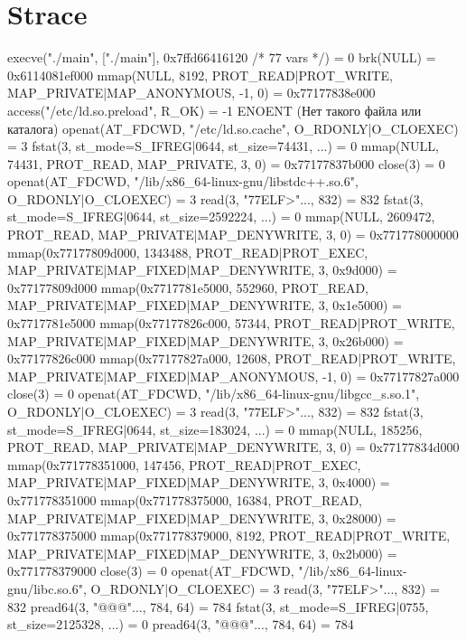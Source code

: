 \section{Strace}
\begin{breakableverbatim}
execve("./main", ["./main"], 0x7ffd66416120 /* 77 vars */) = 0
brk(NULL)                               = 0x6114081ef000
mmap(NULL, 8192, PROT_READ|PROT_WRITE, MAP_PRIVATE|MAP_ANONYMOUS, -1, 0) = 0x77177838e000
access("/etc/ld.so.preload", R_OK)      = -1 ENOENT (Нет такого файла или каталога)
openat(AT_FDCWD, "/etc/ld.so.cache", O_RDONLY|O_CLOEXEC) = 3
fstat(3, {st_mode=S_IFREG|0644, st_size=74431, ...}) = 0
mmap(NULL, 74431, PROT_READ, MAP_PRIVATE, 3, 0) = 0x77177837b000
close(3)                                = 0
openat(AT_FDCWD, "/lib/x86_64-linux-gnu/libstdc++.so.6", O_RDONLY|O_CLOEXEC) = 3
read(3, "\177ELF\2\1\1\3\0\0\0\0\0\0\0\0\3\0>\0\1\0\0\0\0\0\0\0\0\0\0\0"..., 832) = 832
fstat(3, {st_mode=S_IFREG|0644, st_size=2592224, ...}) = 0
mmap(NULL, 2609472, PROT_READ, MAP_PRIVATE|MAP_DENYWRITE, 3, 0) = 0x771778000000
mmap(0x77177809d000, 1343488, PROT_READ|PROT_EXEC, MAP_PRIVATE|MAP_FIXED|MAP_DENYWRITE, 3, 0x9d000) = 0x77177809d000
mmap(0x7717781e5000, 552960, PROT_READ, MAP_PRIVATE|MAP_FIXED|MAP_DENYWRITE, 3, 0x1e5000) = 0x7717781e5000
mmap(0x77177826c000, 57344, PROT_READ|PROT_WRITE, MAP_PRIVATE|MAP_FIXED|MAP_DENYWRITE, 3, 0x26b000) = 0x77177826c000
mmap(0x77177827a000, 12608, PROT_READ|PROT_WRITE, MAP_PRIVATE|MAP_FIXED|MAP_ANONYMOUS, -1, 0) = 0x77177827a000
close(3)                                = 0
openat(AT_FDCWD, "/lib/x86_64-linux-gnu/libgcc_s.so.1", O_RDONLY|O_CLOEXEC) = 3
read(3, "\177ELF\2\1\1\0\0\0\0\0\0\0\0\0\3\0>\0\1\0\0\0\0\0\0\0\0\0\0\0"..., 832) = 832
fstat(3, {st_mode=S_IFREG|0644, st_size=183024, ...}) = 0
mmap(NULL, 185256, PROT_READ, MAP_PRIVATE|MAP_DENYWRITE, 3, 0) = 0x77177834d000
mmap(0x771778351000, 147456, PROT_READ|PROT_EXEC, MAP_PRIVATE|MAP_FIXED|MAP_DENYWRITE, 3, 0x4000) = 0x771778351000
mmap(0x771778375000, 16384, PROT_READ, MAP_PRIVATE|MAP_FIXED|MAP_DENYWRITE, 3, 0x28000) = 0x771778375000
mmap(0x771778379000, 8192, PROT_READ|PROT_WRITE, MAP_PRIVATE|MAP_FIXED|MAP_DENYWRITE, 3, 0x2b000) = 0x771778379000
close(3)                                = 0
openat(AT_FDCWD, "/lib/x86_64-linux-gnu/libc.so.6", O_RDONLY|O_CLOEXEC) = 3
read(3, "\177ELF\2\1\1\3\0\0\0\0\0\0\0\0\3\0>\0\1\0\0\0\2\0\0\0\0\0"..., 832) = 832
pread64(3, "\6\0\0\0\4\0\0\0@\0\0\0\0\0\0\0@\0\0\0\0\0\0\0@\0\0\0\0\0\0\0"..., 784, 64) = 784
fstat(3, {st_mode=S_IFREG|0755, st_size=2125328, ...}) = 0
pread64(3, "\6\0\0\0\4\0\0\0@\0\0\0\0\0\0\0@\0\0\0\0\0\0\0@\0\0\0\0\0\0\0"..., 784, 64) = 784

\end{breakableverbatim}
